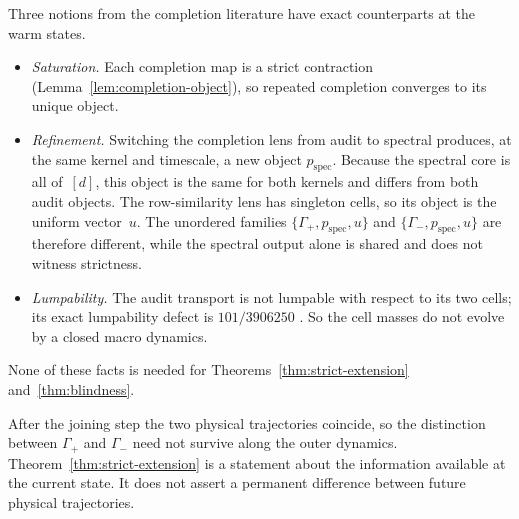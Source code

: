 \begin{remark}\label{rem:refinement}
Three notions from the completion literature have exact counterparts at the warm states.
\begin{itemize}
  \item \emph{Saturation.} Each completion map is a strict contraction (Lemma~\ref{lem:completion-object}), so repeated completion converges to its unique object.
  \item \emph{Refinement.} Switching the completion lens from audit to spectral produces, at the same kernel and timescale, a new object $p_{\mathrm{spec}}$. Because the spectral core is all of~$[d]$, this object is the same for both kernels and differs from both audit objects. The row-similarity lens has singleton cells, so its object is the uniform vector~$u$. The unordered families $\{\Gamma_+,p_{\mathrm{spec}},u\}$ and $\{\Gamma_-,p_{\mathrm{spec}},u\}$ are therefore different, while the spectral output alone is shared and does not witness strictness.
  \item \emph{Lumpability.} The audit transport is not lumpable with respect to its two cells; its exact lumpability defect is $101/3906250$ \cite{KemenySnell1976FiniteMarkovChains}. So the cell masses do not evolve by a closed macro dynamics.
\end{itemize}
None of these facts is needed for Theorems~\ref{thm:strict-extension} and~\ref{thm:blindness}.
\end{remark}

\begin{remark}
After the joining step the two physical trajectories coincide, so the distinction between $\Gamma_+$ and $\Gamma_-$ need not survive along the outer dynamics. Theorem~\ref{thm:strict-extension} is a statement about the information available at the current state. It does not assert a permanent difference between future physical trajectories.
\end{remark}
